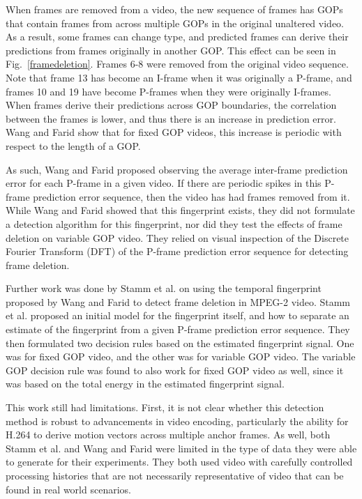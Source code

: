 When frames are removed from a video, the new sequence of frames has GOPs that contain frames from across multiple GOPs in the original unaltered video. As a result, some frames can change type, and predicted frames can derive their predictions from frames originally in another GOP. This effect can be seen in Fig.~\ref{framedeletion}. Frames 6-8 were removed from the original video sequence. Note that frame 13 has become an I-frame when it was originally a P-frame, and frames 10 and 19 have become P-frames when they were originally I-frames. When frames derive their predictions across GOP boundaries, the correlation between the frames is lower, and thus there is an increase in prediction error. Wang and Farid show that for fixed GOP videos, this increase is periodic with respect to the length of a GOP.

As such, Wang and Farid proposed observing the average inter-frame prediction error for each P-frame in a given video. If there are periodic spikes in this P-frame prediction error sequence, then the video has had frames removed from it. While Wang and Farid showed that this fingerprint exists, they did not formulate a detection algorithm for this fingerprint, nor did they test the effects of frame deletion on variable GOP video. They relied on visual inspection of the Discrete Fourier Transform (DFT) of the P-frame prediction error sequence for detecting frame deletion.

Further work was done by Stamm et al. \cite{stamm} on using the temporal fingerprint proposed by Wang and Farid to detect frame deletion in MPEG-2 video. Stamm et al. proposed an initial model for the fingerprint itself, and how to separate an estimate of the fingerprint from a given P-frame prediction error sequence. They then formulated two decision rules based on the estimated fingerprint signal. One was for fixed GOP video, and the other was for variable GOP video. The variable GOP decision rule was found to also work for fixed GOP video as well, since it was based on the total energy in the estimated fingerprint signal.

This work still had limitations. First, it is not clear whether this detection method is robust to advancements in video encoding, particularly the ability for H.264 to derive motion vectors across multiple anchor frames. As well, both Stamm et al. and Wang and Farid were limited in the type of data they were able to generate for their experiments. They both used video with carefully controlled processing histories that are not necessarily representative of video that can be found in real world scenarios.


